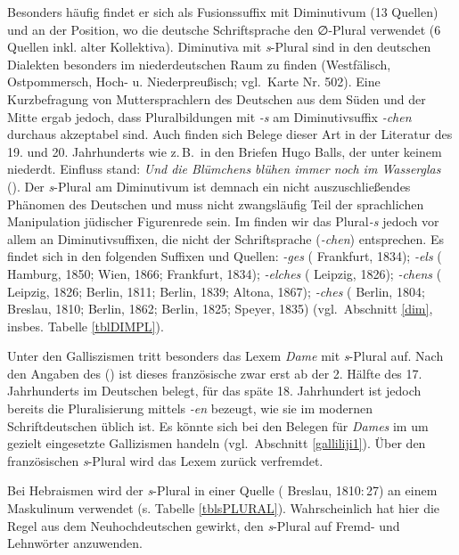   Besonders häufig findet er sich als Fusionssuffix mit Diminutivum (13 Quellen) und  an der Position, wo die deutsche Schriftsprache den ∅-Plural verwendet (6 Quellen inkl. alter Kollektiva). Diminutiva mit \textit{s}-Plural sind in den deutschen Dialekten besonders im niederdeutschen Raum zu finden (Westfälisch, Ostpommersch, Hoch- u. Niederpreußisch; vgl.\,  Karte Nr. 502). Eine Kurzbefragung von Muttersprachlern des Deutschen aus dem Süden und der Mitte ergab jedoch, dass Pluralbildungen mit \textit{-s} am Diminutivsuffix \textit{-chen} durchaus akzeptabel sind. Auch finden sich  Belege dieser Art in der Literatur des 19. und 20. Jahrhunderts wie z.\,B.\, in den Briefen Hugo Balls, der unter keinem niederdt. Einfluss stand: \textit{Und die Blümchens blühen immer noch im Wasserglas} (\citealt[256]{Ball2003}). Der \textit{s}-Plural am Diminutivum ist demnach ein nicht auszuschließendes Phänomen des Deutschen und muss nicht zwangsläufig Teil der sprachlichen Manipulation jüdischer Figurenrede sein. Im  finden wir das Plural\textit{-s} jedoch vor allem an Diminutivsuffixen, die nicht der Schriftsprache (\textit{-chen}) entsprechen. Es findet sich in den folgenden Suffixen und Quellen: \textit{-ges} ( Frankfurt, 1834); \mbox{\textit{-els}} ( Hamburg, 1850;  Wien, 1866;  Frankfurt, 1834); \textit{-elches} ( Leipzig, 1826); \textit{-chens} ( Leipzig, 1826;  Berlin, 1811; \hai{{\PP}} Berlin, 1839;  Altona, 1867); \textit{-ches} ( Berlin, 1804;  Breslau, 1810;  Berlin, 1862;  Berlin, 1825;  Speyer, 1835) (vgl.\, Abschnitt \ref{dim}, insbes. Tabelle \ref{tblDIMPL}). 

  
   Unter den Galliszismen tritt besonders das Lexem \textit{Dame} mit \textit{s}-Plural auf. Nach den Angaben des  (\citeyear[Bd. 2, Sp. 702]{DeutschesWB}) ist dieses französische  zwar erst ab der 2. Hälfte des 17. Jahrhunderts im Deutschen belegt, für das späte 18. Jahrhundert ist jedoch bereits die Pluralisierung mittels \textit{-en} bezeugt, wie sie im modernen Schriftdeutschen üblich ist. Es könnte sich bei den Belegen für \textit{Dames} im  um gezielt eingesetzte Gallizismen handeln (vgl.\, Abschnitt \ref{galliliji1}). Über den französischen \textit{s}-Plural wird das Lexem zurück verfremdet.
     
  Bei Hebraismen wird der \textit{s}-Plural in einer Quelle ( Breslau, 1810:\,27) an einem Maskulinum verwendet (s. Tabelle \ref{tblsPLURAL}). Wahrscheinlich hat hier die Regel aus dem Neuhochdeutschen gewirkt, den \textit{s}-Plural auf Fremd- und Lehnwörter anzuwenden.

